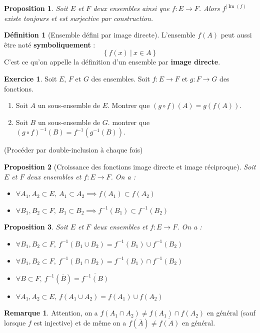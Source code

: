 \documentclass[french]{book}
\newcommand{\inv}{^{-1}}
\theoremstyle{plain}
\newtheorem{prop}{Proposition}[chapter]
\theoremstyle{definition}
\newtheorem{dfn}{Définition}[chapter]
\newtheorem{rmq}{Remarque}[chapter]
\newtheorem{exe}{Exercice}[chapter]
\theoremstyle{remark}
\DeclareMathOperator{\im}{Im}
\begin{document}
\begin{prop}
	Soit $E$ et $F$ deux ensembles ainsi que $f:E\rightarrow F$. Alors $f^{|\im(f)}$ existe toujours et est surjective par construction.
\end{prop}
\begin{dfn}[Ensemble défini par image directe]
	L'ensemble $f(A)$ peut aussi être noté \textbf{symboliquement} : $$\left\{f(x)\ | \ x\in A\right\}$$ C'est ce qu'on appelle la définition d'un ensemble par \textbf{image directe}.
\end{dfn}
\begin{exe}
	Soit $E$, $F$ et $G$ des ensembles. Soit $f:E\rightarrow F$ et $g:F\rightarrow G$ des fonctions.
	\begin{enumerate}
		\item Soit $A$ un sous-ensemble de $E$. Montrer que $(g\circ f)(A)=g(f(A))$.
		\item Soit $B$ un sous-ensemble de $G$. montrer que $(g\circ f)\inv(B)=f\inv(g\inv(B))$.
	\end{enumerate}
	(Procéder par double-inclusion à chaque fois)
\end{exe}
\begin{prop}[Croissance des fonctions image directe et image réciproque]
	Soit $E$ et $F$ deux ensembles et $f:E\rightarrow F$. On a : 
	\begin{itemize}
		\item $\forall A_1,A_2\subset E,\ A_1\subset A_2\implies f(A_1)\subset f(A_2)$
		\item $\forall B_1,B_2\subset F,\ B_1\subset B_2\implies f\inv(B_1)\subset f\inv(B_2)$
	\end{itemize}
\end{prop}
\begin{prop}
	Soit $E$ et $F$ deux ensembles et $f:E\rightarrow F$. On a :
	\begin{itemize}
		\item $\forall B_1,B_2\subset F,\ f\inv(B_1\cup B_2)=f\inv(B_1)\cup f\inv(B_2)$
		\item $\forall B_1,B_2\subset F,\ f\inv(B_1\cap B_2)=f\inv(B_1)\cap f\inv(B_2)$
		\item $\forall B\subset F,\ f\inv(\overline{B})=\overline{f\inv(B)}$
		\item $\forall A_1,A_2\subset E, \ f(A_1\cup A_2)=f(A_1)\cup f(A_2)$
	\end{itemize}
\end{prop}
\begin{rmq}
	Attention, on a $f(A_1\cap A_2)\ne f(A_1)\cap f(A_2)$ en général (sauf lorsque $f$ est injective) et de même on a $f(\overline{A})\ne\overline{f(A)}$ en général.
\end{rmq}
\end{document}
